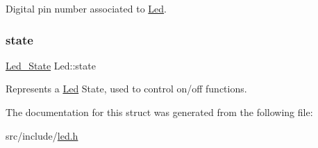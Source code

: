 Digital pin number associated to \mbox{\hyperlink{structLed}{Led}}. 

\mbox{\label{structLed_a06ca8144f0c60cd7f6fa4733fed5006e}} 
\subsubsection{\texorpdfstring{state}{state}}
{\footnotesize\ttfamily \mbox{\hyperlink{led_8h_a0b3e708a23789547325388652a07cc6a}{Led\+\_\+\+State}} Led\+::state}



Represents a \mbox{\hyperlink{structLed}{Led}} State, used to control on/off functions. 



The documentation for this struct was generated from the following file\+:\begin{DoxyCompactItemize}
\item 
src/include/\mbox{\hyperlink{led_8h}{led.\+h}}\end{DoxyCompactItemize}
